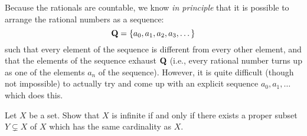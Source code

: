 \begin{remark}\label{8.1.16}
    Because the rationals are countable, we know \emph{in principle} that it is possible to arrange the rational numbers as a sequence:
    \[
        \mathbf{Q} = \{a_0, a_1, a_2, a_3, \dots\}
    \]
    such that every element of the sequence is different from every other element, and that the elements of the sequence exhaust \(\mathbf{Q}\)
    (i.e., every rational number turns up as one of the elements \(a_n\) of the sequence).
    However, it is quite difficult (though not impossible) to actually try and come up with an explicit sequence \(a_0, a_1, \dots\) which does this.
\end{remark}

\exercisesection

\begin{exercise}\label{ex 8.1.1}
    Let \(X\) be a set.
    Show that \(X\) is infinite if and only if there exists a proper subset \(Y \subsetneq X\) of \(X\) which has the same cardinality as \(X\).
\end{exercise}

